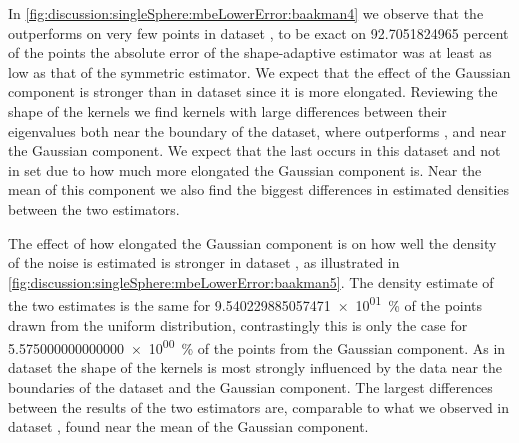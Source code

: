 		In \cref{fig:discussion:singleSphere:mbeLowerError:baakman4} we observe that the \mbe outperforms \sambe on very few points in dataset \baakmanFour, to be exact on \num{92.7051824965} percent of the points the absolute error of the shape-adaptive estimator was at least as low as that of the symmetric estimator. We expect that the effect of the Gaussian component is stronger than in dataset \baakmanOne since it is more elongated.
		Reviewing the shape of the kernels we find kernels with large differences between their eigenvalues both near the boundary of the dataset, where \sambe outperforms \mbe, and near the Gaussian component. We expect that the last occurs in this dataset and not in set \baakmanOne due to how much more elongated the Gaussian component is. 
		Near the mean of this component we also find the biggest differences in estimated densities between the two estimators.






		The effect of how elongated the Gaussian component is on how well the density of the noise is estimated is stronger in dataset \baakmanFive, as illustrated in \cref{fig:discussion:singleSphere:mbeLowerError:baakman5}. The density estimate of the two estimates is the same for \SI{9.540229885057471e+01}{\percent} of the points drawn from the uniform distribution, contrastingly this is only the case for \SI{5.575000000000000e+00}{\percent} of the points from the Gaussian component. 
		As in dataset \baakmanFour the shape of the kernels is most strongly influenced by the data near the boundaries of the dataset and the Gaussian component.
		The largest differences between the results of the two estimators are, comparable to what we observed in dataset \baakmanFour, found near the mean of the Gaussian component. 

